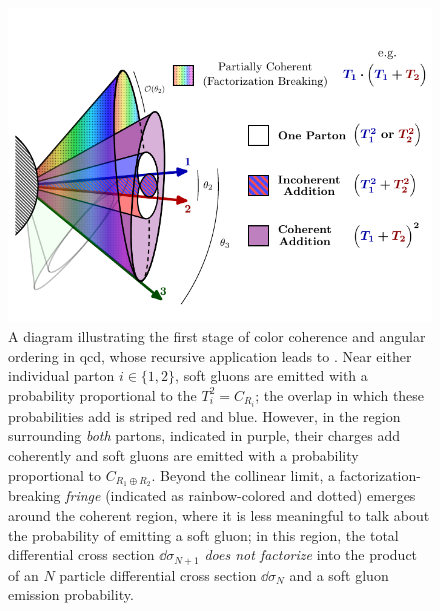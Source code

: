 \begin{figure}[t!]
    \centering
    \includegraphics[width=1.05\textwidth]{figures/misc/color_coherence.pdf}
    \caption[A diagram illustrating color coherence and angular ordering in QCD.]
    {
        A diagram illustrating the first stage of color coherence and angular ordering in \gls{qcd}, whose recursive application leads to .
        Near either individual parton \(i\in\{1,2\}\), soft gluons are emitted with a probability proportional to the \(T_i^2 = C_{R_i}\);
        the overlap in which these probabilities add is striped red and blue.
        However, in the region surrounding \emph{both} partons, indicated in purple, their charges add coherently and soft gluons are emitted with a probability proportional to \(C_{R_1\oplus R_2}\).
        Beyond the collinear limit, a factorization-breaking \emph{fringe} (indicated as rainbow-colored and dotted) emerges around the coherent region, where it is less meaningful to talk about the probability of emitting a soft gluon;
        in this region, the total differential cross section \(\dd\sigma_{N+1}\) \emph{does not factorize} into the product of an \(N\) particle differential cross section \(\dd\sigma_{N}\) and a soft gluon emission probability.
    }
    \label{fig:qcd-coherent-branching}
\end{figure}




